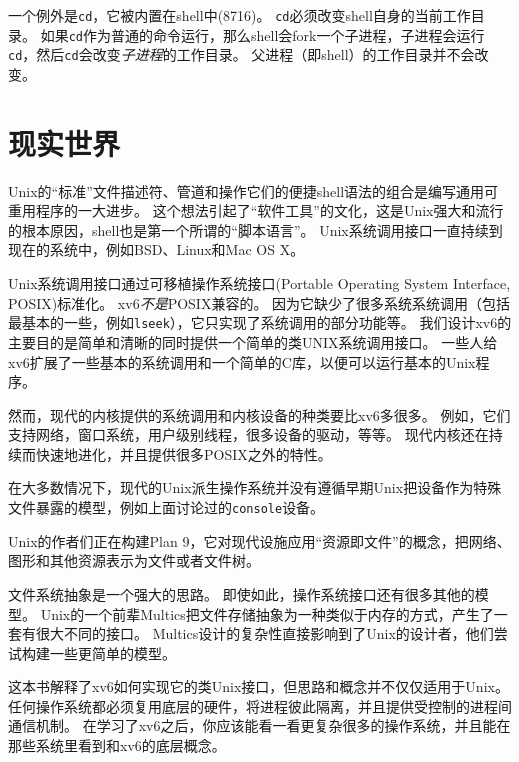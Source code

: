 一个例外是\texttt{cd}，它被内置在shell中(8716)。
\texttt{cd}必须改变shell自身的当前工作目录。
如果\texttt{cd}作为普通的命令运行，那么shell会fork一个子进程，子进程会运行\texttt{cd}，然后\texttt{cd}会改变\emph{子进程}的工作目录。
父进程（即shell）的工作目录并不会改变。

\section*{现实世界}
Unix的“标准”文件描述符、管道和操作它们的便捷shell语法的组合是编写通用可重用程序的一大进步。
这个想法引起了“软件工具”的文化，这是Unix强大和流行的根本原因，shell也是第一个所谓的“脚本语言”。
Unix系统调用接口一直持续到现在的系统中，例如BSD、Linux和Mac OS X。

Unix系统调用接口通过可移植操作系统接口(Portable Operating System Interface, POSIX)标准化。
xv6\emph{不是}POSIX兼容的。
因为它缺少了很多系统系统调用（包括最基本的一些，例如\texttt{lseek}），它只实现了系统调用的部分功能等。
我们设计xv6的主要目的是简单和清晰的同时提供一个简单的类UNIX系统调用接口。
一些人给xv6扩展了一些基本的系统调用和一个简单的C库，以便可以运行基本的Unix程序。

然而，现代的内核提供的系统调用和内核设备的种类要比xv6多很多。
例如，它们支持网络，窗口系统，用户级别线程，很多设备的驱动，等等。
现代内核还在持续而快速地进化，并且提供很多POSIX之外的特性。

在大多数情况下，现代的Unix派生操作系统并没有遵循早期Unix把设备作为特殊文件暴露的模型，例如上面讨论过的\texttt{console}设备。

Unix的作者们正在构建Plan 9，它对现代设施应用“资源即文件”的概念，把网络、图形和其他资源表示为文件或者文件树。

文件系统抽象是一个强大的思路。
即使如此，操作系统接口还有很多其他的模型。
Unix的一个前辈Multics把文件存储抽象为一种类似于内存的方式，产生了一套有很大不同的接口。
Multics设计的复杂性直接影响到了Unix的设计者，他们尝试构建一些更简单的模型。

这本书解释了xv6如何实现它的类Unix接口，但思路和概念并不仅仅适用于Unix。
任何操作系统都必须复用底层的硬件，将进程彼此隔离，并且提供受控制的进程间通信机制。
在学习了xv6之后，你应该能看一看更复杂很多的操作系统，并且能在那些系统里看到和xv6的底层概念。
